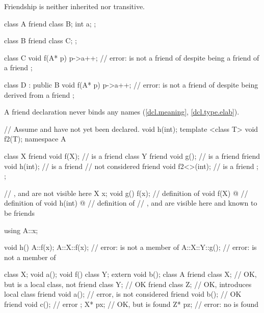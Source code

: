 \pnum
{}%
Friendship is neither inherited nor transitive.
\begin{example}
\begin{codeblock}
class A {
  friend class B;
  int a;
};

class B {
  friend class C;
};

class C  {
  void f(A* p) {
    p->a++;         // error:  is not a friend of  despite being a friend of a friend
  }
};

class D : public B  {
  void f(A* p) {
    p->a++;         // error:  is not a friend of  despite being derived from a friend
  }
};
\end{codeblock}
\end{example}

\pnum
{}%
%
\begin{note}
A friend declaration never binds any names
(\ref{dcl.meaning}, \ref{dcl.type.elab}).
\end{note}
\begin{example}
\begin{codeblock}
// Assume  and  have not yet been declared.
void h(int);
template <class T> void f2(T);
namespace A {
  class X {
    friend void f(X);           //  is a friend
    class Y {
      friend void g();          //  is a friend
      friend void h(int);       //  is a friend
                                //  not considered
      friend void f2<>(int);    //  is a friend
    };
  };

  // ,  and  are not visible here
  X x;
  void g() { f(x); }            // definition of 
  void f(X) { @\commentellip@ }       // definition of 
  void h(int) { @\commentellip@ }     // definition of 
  // ,  and  are visible here and known to be friends
}

using A::x;

void h() {
  A::f(x);
  A::X::f(x);                   // error:  is not a member of 
  A::X::Y::g();                 // error:  is not a member of 
}
\end{codeblock}
\end{example}
\begin{example}
\begin{codeblock}
class X;
void a();
void f() {
  class Y;
  extern void b();
  class A {
  friend class X;   // OK, but  is a local class, not 
  friend class Y;   // OK
  friend class Z;   // OK, introduces local class 
  friend void a();  // error,  is not considered
  friend void b();  // OK
  friend void c();  // error
  };
  X* px;            // OK, but  is found
  Z* pz;            // error: no  is found
}
\end{codeblock}
\end{example}

